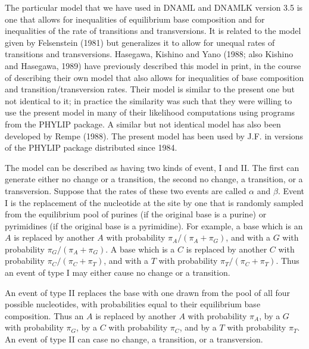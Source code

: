 \documentclass[12pt]{article}
\begin{document}
The particular model that we have used in DNAML and DNAMLK version 3.5 is
one that allows for inequalities of equilibrium base composition and for
inequalities of the rate of transitions and transversions.  It is related to
the model given by Felsenstein (1981) but generalizes it to allow for
unequal rates of transitions and transversions.  Hasegawa, Kishino and Yano
(1988; also Kishino and Hasegawa, 1989) have previously described this model
in print, in the course of
describing their own model that also allows for inequalities of base
composition and transition/transversion rates.  Their model is similar
to the present one but not identical to it; in practice the similarity was such
that they were willing to
use the present model in many of their likelihood computations using programs
from the PHYLIP package.  A similar but not identical model has also been
developed by Rempe (1988).  The present model has been
used by J.F. in versions of the PHYLIP package distributed since 1984. 

The model can be described as having two kinds of event, I and II.  The
first can generate either no change or a transition, the second no change,
a transition, or a transversion.  Suppose that the rates of these two events
are called $\alpha$ and $\beta$.  Event I is the replacement of the
nucleotide at the site by one that is randomly sampled from the equilibrium
pool of purines (if the original base is a purine) or pyrimidines (if the
original base is a pyrimidine).  For example, a base which is an $A$
is replaced by another $A$ with probability $\pi_A/(\pi_A+\pi_G)$, and
with a $G$ with probability $\pi_G/(\pi_A+\pi_G)$.  A base which is a $C$
is replaced by another $C$ with probability $\pi_C/(\pi_C+\pi_T)$, and
with a $T$ with probability $\pi_T/(\pi_C+\pi_T)$.  Thus an event of type I
may either cause no change or a transition.

An event of type II replaces the base with one drawn from the pool of all
four possible nucleotides, with probabilities equal to their equilibrium
base composition.  Thus an $A$ is replaced by another $A$ with probability
$\pi_A$, by a $G$ with probability $\pi_G$, by a $C$ with probability $\pi_C$,
and by a $T$ with probability $\pi_T$.  An event of type II can case no
change, a transition, or a transversion.
\end{document}
